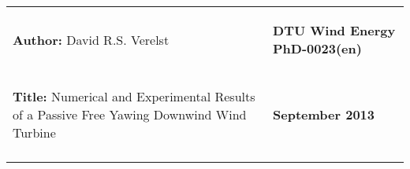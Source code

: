 
\begin{table}[!htb]
\centering
\begin{tabular}{l|l}

\begin{minipage}[t]{0.58\textwidth} %
\begin{flushleft}
\small \textbf{Author:} David R.S. Verelst
\end{flushleft}
\end{minipage} & %
\begin{minipage}[t]{0.42\textwidth}
\begin{flushleft}

\small \textbf{DTU Wind Energy PhD-0023(en)}
\end{flushleft}
\end{minipage} \\ 
\begin{minipage}[t][1cm][t]{0.58\textwidth} %
\begin{flushleft}
\small \textbf{Title:} Numerical and Experimental Results of a Passive Free Yawing Downwind Wind Turbine
\end{flushleft}
\end{minipage} & %
\begin{minipage}[t]{0.42\textwidth} %
\begin{flushleft}
\small \textbf{September 2013}
\end{flushleft}
\end{minipage} \\ [2.0em]
\begin{minipage}[t]{0.57\textwidth} %
\begin{flushleft} 


\end{flushleft}
\end{minipage}
\end{tabular}
\end{table}
